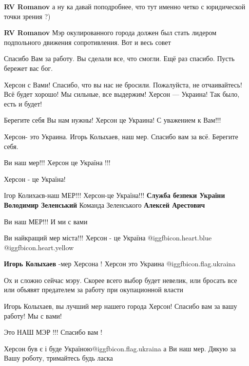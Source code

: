 \begin{itemize}
\begin{itemize} %
\textbf{RV Romanov} а ну ка давай поподробнее, что тут именно четко с юридической точки зрения ?)

\textbf{RV Romanov} Мэр окулированного города должен был стать лидером подпольного движения сопротивления. Вот и весь совет
\end{itemize} %

Спасибо Вам за работу. Вы сделали все, что смогли. Ещё раз спасибо. Пусть бережет вас бог.


Херсон с Вами! Спасибо, что вы нас не бросили. Пожалуйста, не отчаивайтесь! Всё
будет хорошо! Мы сильные, все выдержим! Херсон --- Украина! Так было, есть и
будет!

Берегите себя Вы нам нужны! Херсон це Украина! С уважением к Вам!!!

Херсон- это Украина. Игорь Колыхаев, наш мер. Спасибо вам за всё. Берегите себя.

Ви наш мер!!! Херсон це Україна !!!

Херсон - це Україна!

Ігор Колихаєв-наш МЕР!!!
Херсон-це Україна!!!
\textbf{Служба безпеки України}
\textbf{Володимир Зеленський}
Команда Зеленського
\textbf{Алексей Арестович}

Ви наш МЕР!!! И ми с вами

Ви найкращий мер міста!!! Херсон - це Україна  @igg{fbicon.heart.blue}  @igg{fbicon.heart.yellow} 

\textbf{Игорь Колыхаев} -мер Херсона ! Херсон это Украина @igg{fbicon.flag.ukraina}


Ох и сложно сейчас мэру. Скорее всего выбор будет невелик, или бросать все или
объявят предателем за работу при окупационной власти

Игорь Колыхаев, вы лучший мер нашего города Херсон! Спасибо вам за вашу работу! Мы с вами!

Это НАШ МЭР !!! Спасибо вам !

Херсон був є і буде Україною@igg{fbicon.flag.ukraina} а Ви наш мер. Дякую за Вашу роботу, тримайтесь будь ласка


\end{itemize}
